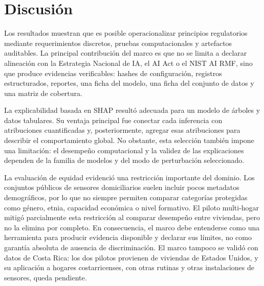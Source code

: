 
\section{Discusión}

Los resultados muestran que es posible operacionalizar principios regulatorios
mediante requerimientos discretos, pruebas computacionales y artefactos
auditables. La principal contribución del marco es que no se limita a declarar
alineación con la Estrategia Nacional de IA, el AI Act o el NIST AI RMF, sino
que produce evidencias verificables: hashes de configuración, registros
estructurados, reportes, una ficha del modelo, una ficha del conjunto de datos y
una matriz de cobertura.

La explicabilidad basada en SHAP resultó adecuada para un modelo de árboles y
datos tabulares. Su ventaja principal fue conectar cada inferencia con
atribuciones cuantificadas y, posteriormente, agregar esas atribuciones para
describir el comportamiento global. No obstante, esta selección también impone
una limitación: el desempeño computacional y la validez de las explicaciones
dependen de la familia de modelos y del modo de perturbación seleccionado.

La evaluación de equidad evidenció una restricción importante del dominio. Los
conjuntos públicos de sensores domiciliarios suelen incluir pocos metadatos
demográficos, por lo que no siempre permiten comparar categorías protegidas
como género, etnia, capacidad económica o nivel formativo. El piloto
multi-hogar mitigó parcialmente esta restricción al comparar desempeño entre
viviendas, pero no la elimina por completo. En consecuencia, el marco debe
entenderse como una herramienta para producir evidencia disponible y declarar
sus límites, no como garantía absoluta de ausencia de discriminación. El marco
tampoco se validó con datos de Costa Rica: los dos pilotos provienen de viviendas
de Estados Unidos, y su aplicación a hogares costarricenses, con otras rutinas y
otras instalaciones de sensores, queda pendiente.

